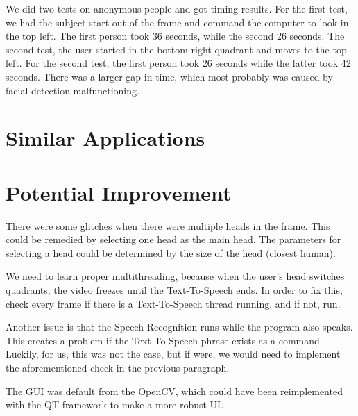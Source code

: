 \documentclass{article}
\begin{document}
We did two tests on anonymous people and got timing results.
For the first test, we had the subject start out of the frame and command the computer to look in the top left.
The first person took 36 seconds, while the second 26 seconds.
The second test, the user started in the bottom right quadrant and moves to the top left.
For the second test, the first person took 26 seconds while the latter took 42 seconds.
There was a larger gap in time, which most probably was caused by facial detection malfunctioning.


\section{Similar Applications}
\section{Potential Improvement}


There were some glitches when there were multiple heads in the frame.
This could be remedied by selecting one head as the main head.
The parameters for selecting a head could be determined by the size of the head (closest human).


We need to learn proper multithreading, because when the user's head switches quadrants, the video freezes until the Text-To-Speech ends.
In order to fix this, check every frame if there is a Text-To-Speech thread running, and if not, run.


Another issue is that the Speech Recognition runs while the program also speaks.
This creates a problem if the Text-To-Speech phrase exists as a command.
Luckily, for us, this was not the case, but if were, we would need to implement the aforementioned check in the previous paragraph.


The GUI was default from the OpenCV, which could have been reimplemented with the QT framework to make a more robust UI.




\end{document}
